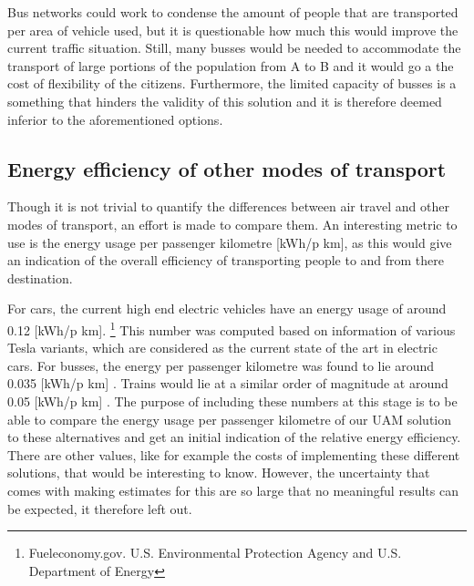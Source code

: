 Bus networks could work to condense the amount of people that are transported per area of vehicle used, but it is questionable how much this would improve the current traffic situation. Still, many busses would be needed to accommodate the transport of large portions of the population from A to B and it would go a the cost of flexibility of the citizens. Furthermore, the limited capacity of busses is a something that hinders the validity of this solution and it is therefore deemed inferior to the aforementioned options.  


\subsection{Energy efficiency of other modes of transport}
Though it is not trivial to quantify the differences between air travel and other modes of transport, an effort is made to compare them. An interesting metric to use is the energy usage per passenger kilometre [kWh/p km], as this would give an indication of the overall efficiency of transporting people to and from there destination.

For cars, the current high end electric vehicles have an energy usage of around 0.12 [kWh/p km]. \footnote{Fueleconomy.gov. U.S. Environmental Protection Agency and U.S. Department of Energy} This number was computed based on information of various Tesla variants, which are considered as the current state of the art in electric cars. For busses, the energy per passenger kilometre was found to lie around 0.035 [kWh/p km] \cite{TNOstuff} \citep{Latvianstuff}. Trains would lie at a similar order of magnitude at around 0.05 [kWh/p km] \cite{Trainstuff}. The purpose of including these numbers at this stage is to be able to compare the energy usage per passenger kilometre of our UAM solution to these alternatives and get an initial indication of the relative energy efficiency. There are other values, like for example the costs of implementing these different solutions, that would be interesting to know. However, the uncertainty that comes with making estimates for this are so large that no meaningful results can be expected, it therefore left out. 









